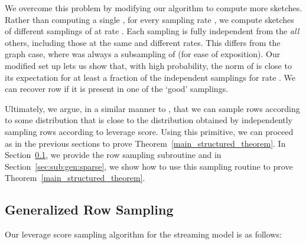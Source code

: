 \documentclass[11pt]{article}
\newcommand{\bv}[1]{\mathbf{#1}}
\begin{document}
We overcome this problem by modifying our algorithm to compute more sketches. Rather than computing a single , for every sampling rate , we compute  sketches of different samplings of  at rate . Each sampling is fully independent from the \emph{all} others, including those at the same and different rates. This differs from the graph case, where  was always a subsampling of  (for ease of exposition). Our modified set up lets us show that, with high probability, the norm of  is close to its expectation for at least a  fraction of the independent samplings for rate . We  can recover row  if it is present in one of the `good' samplings. 

Ultimately, we argue, in a similar manner to \cite{KP12}, that we can sample rows according to some distribution that is close to the distribution obtained by independently sampling rows according to leverage score. Using this primitive, we can proceed as in the previous sections to prove Theorem~\ref{main_structured_theorem}. In Section~\ref{sec:sub:gen:row}, we provide the row sampling subroutine and in Section~\ref{sec:sub:gen:sparse}, we show how to use this sampling routine to prove Theorem~\ref{main_structured_theorem}. 


\subsection{Generalized Row Sampling}
\label{sec:sub:gen:row}
Our leverage score sampling algorithm for the streaming model is as follows:


\newcommand{\strlev}{\tilde{\tau}}
\newcommand{\vxst}{\bv{x}_s^{(t)}}
\newcommand{\vxsit}{\bv{x}_{s_i}^{(t)}}
\newcommand{\vxsiti}{\bv{x}_{s_i}^{(t_i)}}
\newcommand{\xsit}{\bv{x}_{s_i}^{(t)}}
\newcommand{\xsiti}{\bv{x}_{s_i}^{(t_i)}}
\end{document}
